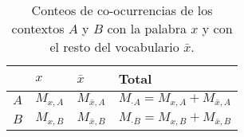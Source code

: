 

\begin{table}[h]
  \centering
  \begin{tabular}{l|lll}
    \hline
        & $x$       & $\bar{x}$       & \textbf{Total}                          \\ \hline
    $A$ & $M_{x,A}$ & $M_{\bar{x},A}$ & $M_{\cdot A} = M_{x,A} + M_{\bar{x},A}$ \\
    $B$ & $M_{x,B}$ & $M_{\bar{x},B}$ & $M_{\cdot B} = M_{x,B} + M_{\bar{x},B}$ \\ \hline
  \end{tabular}
  \caption{
    Conteos de co-ocurrencias de los contextos $A$ y $B$ con la palabra $x$ y con el resto del vocabulario $\bar{x}$.
  }
  \label{tab:contingency}
\end{table}




